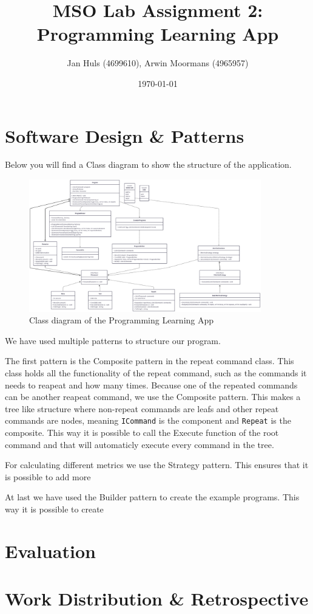 \documentclass[11pt,a4paper]{article}
\date{\monthyear\today}
\title{\textbf{MSO Lab Assignment 2:\\
Programming Learning App}}
\author{Jan Huls (4699610), Arwin Moormans (4965957)}
\begin{document}
\maketitle
\section*{Software Design \& Patterns}
Below you will find a Class diagram to show the structure of the application.

\begin{figure}[htbp]\label{fig:class-diagram}
  \centering
  \includegraphics[width=0.9\textwidth]{class_diagram.png}
  \caption{Class diagram of the Programming Learning App}
\end{figure}
We have used multiple patterns to structure our program. 

The first pattern is the Composite pattern in the repeat command class.
This class holds all the functionality of the repeat command, such as the commands it needs to reapeat and how many times.
Because one of the repeated commands can be another reapeat command, we use the Composite pattern.
This makes a tree like structure where non-repeat commands are leafs and other repeat commands are nodes, meaning \texttt{ICommand} is the component and \texttt{Repeat} is the composite.
This way it is possible to call the Execute function of the root command and that will automaticly execute every command in the tree.

For calculating different metrics we use the Strategy pattern.
This ensures that it is possible to add more 

At last we have used the Builder pattern to create the example programs.
This way it is possible to create 



\section*{Evaluation}

\section*{Work Distribution \& Retrospective}
\end{document}
